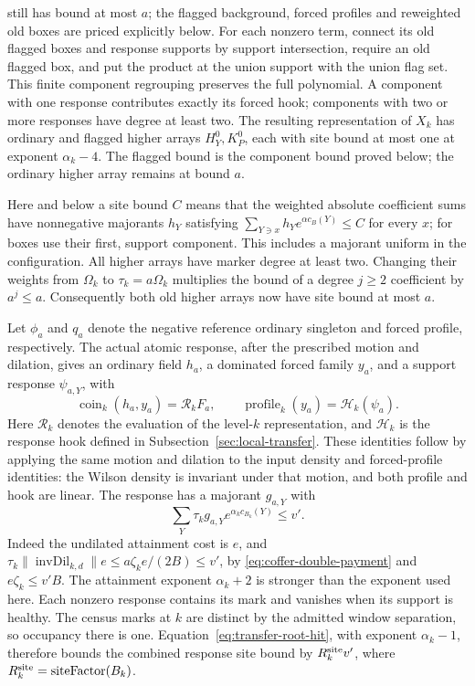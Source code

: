 still has bound at most $a$; the flagged background, forced profiles
and reweighted old boxes are priced explicitly below.
For each nonzero term, connect its old flagged boxes and response
supports by support intersection, require an old flagged box, and put
the product at the union support with the union flag set. This finite
component regrouping preserves the full polynomial. A component with
one response contributes exactly its forced hook; components with two
or more responses have degree at least two. The resulting representation
of $X_k$ has ordinary and flagged higher arrays $H^0_Y,K^0_P$, each
with site bound at most one at exponent $\alpha_k-4$. The flagged
bound is the component bound proved below; the ordinary higher array
remains at bound $a$.

Here and below a site bound $C$ means that the weighted absolute
coefficient sums have nonnegative majorants $h_Y$ satisfying
$\sum_{Y\ni x}h_Ye^{\alpha c_{B}(Y)}\le C$ for every $x$;
for boxes use their first, support component. This includes a
majorant uniform in the configuration. All higher arrays have
marker degree at least two. Changing their weights from
$\Omega_k$ to $\tau_k=a\Omega_k$ multiplies the bound of a degree
$j\ge2$ coefficient by $a^j\le a$. Consequently both old higher
arrays now have site bound at most $a$.

Let $\phi_a$ and $q_a$ denote the negative reference ordinary
singleton and forced profile, respectively. The actual atomic
response, after the prescribed motion and dilation, gives an
ordinary field $h_a$, a dominated forced family $y_a$, and a
support response $\psi_{a,Y}$, with
\begin{equation}\label{eq:coffer-response-coin}
 \operatorname{coin}_k(h_a,y_a)=\mathscr R_k F_a,
 \qquad \operatorname{profile}_k(y_a)=\mathcal H_k(\psi_a).
\end{equation}
Here $\mathscr R_k$ denotes the evaluation of the level-$k$ representation,
and $\mathcal H_k$ is the response hook defined in
Subsection~\ref{sec:local-transfer}. These identities follow by applying
the same motion and dilation to the input density and forced-profile
identities: the Wilson density is invariant under that motion, and
both profile and hook are linear. The response has a majorant
$g_{a,Y}$ with
\[
 \sum_Y\tau_k g_{a,Y}e^{\alpha_k c_{B_k}(Y)}\le v'.
\]
Indeed the undilated attainment cost is $e$, and
$\tau_k\|\operatorname{invDil}_{k,d}\|e\le
 a\zeta_k e/(2B)\le v'$, by
\eqref{eq:coffer-double-payment} and $e\zeta_k\le v'B$.
The attainment exponent $\alpha_k+2$ is stronger than the exponent
used here. Each nonzero response contains its mark and vanishes
when its support is healthy. The census marks at $k$ are distinct
by the admitted window separation, so occupancy there is one.
Equation~\eqref{eq:transfer-root-hit}, with exponent $\alpha_k-1$,
therefore bounds the combined response site bound by $R_k^{\rm site}v'$,
where $R_k^{\rm site}=\operatorname{siteFactor}(B_k)$.

